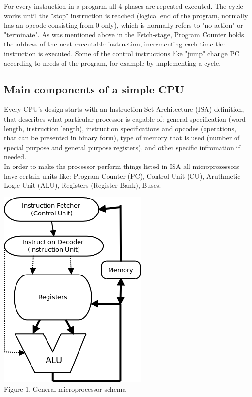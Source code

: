 \documentclass[11pt,a4paper]{article}
\begin{document}
For every instruction in a progarm all 4 phases are repeated executed. The cycle works until the "stop" instruction is reached (logical end of the program, normally has an opcode consisting from 0 only), which is normally refers to "no action" or "terminate". As was mentioned above in the Fetch-stage, Program Counter holds the address of the next executable instruction, incrementing each time the instruction is executed. Some of the control instructions like "jump" change PC according to needs of the program, for example by implementing a cycle.\\
\subsection{Main components of a simple CPU}
Every CPU's design starts with an Instruction Set Architecture (ISA) definition, that describes what particular processor is capable of: general specification (word length, instruction length), instruction specifications and opcodes (operations, that can be presented in binary form), type of memory that is used (number of special purpose and general purpose registers), and other specific infromation if needed. \\
In order to make the processor perform things listed in ISA all microprozessors have certain units like: Program Counter (PC), Control Unit (CU), Aruthmetic Logic Unit (ALU), Registers (Register Bank), Buses.\\
\begin{center}
\includegraphics[scale=0.4]{pics/simpleCPU3.png}\\
Figure 1. General microprocessor schema
\end{center}
\end{document}
